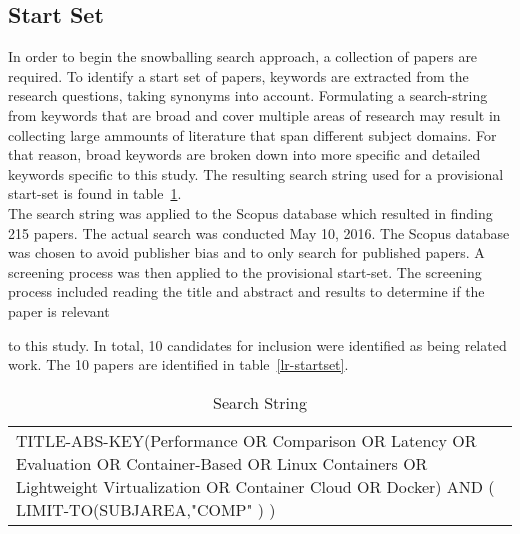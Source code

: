 
\subsection{Start Set}
In order to begin the snowballing search approach, a collection of papers are required. To identify a start set of papers, keywords are extracted from the research questions, taking synonyms into account. Formulating a search-string from keywords that are broad and cover multiple areas of research may result in collecting large ammounts of literature that span different subject domains. For that reason, broad keywords are broken down into more specific and detailed keywords specific to this study. The resulting search string used for a provisional start-set is found in table~\ref{search-string}. \\

The search string was applied to the Scopus database \cite{scopus} which resulted in finding 215 papers. The actual search was conducted May 10, 2016. The Scopus database was chosen to avoid publisher bias and to only search for published papers. A screening process was then applied to the provisional start-set. The screening process included reading the title and abstract and results to determine if the paper is relevant


 to this study. In total, 10 candidates for inclusion were identified as being related work. The 10 papers are identified in table~\ref{lr-startset}.

\begin{table}[h]
\centering
\begin{tabular}{p{15cm}}
TITLE-ABS-KEY(Performance OR Comparison OR Latency OR Evaluation OR Container-Based OR Linux Containers OR Lightweight Virtualization OR Container Cloud OR Docker) AND ( LIMIT-TO(SUBJAREA,"COMP" ) )
\end{tabular}
\caption{Search String}
\label{search-string}
\end{table}

